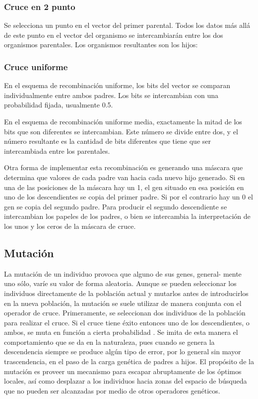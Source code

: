 \subsubsection{Cruce en 2 punto}\label{cruce2puntos}
Se selecciona un punto en el vector del primer parental. Todos los datos más allá de este punto en el vector del organismo se intercambiarán entre los dos organismos parentales. Los organismos resultantes son los hijos:

\subsubsection{Cruce uniforme}\label{cruceuniforme}

En el esquema de recombinación uniforme, los bits del vector se comparan individualmente entre ambos padres. Los bits se intercambian con una probabilidad fijada, usualmente 0.5.

En el esquema de recombinación uniforme media, exactamente la mitad de los bits que son diferentes se intercambian. Este número se divide entre dos, y el número resultante es la cantidad de bits diferentes que tiene que ser intercambiada entre los parentales.


Otra forma de implementar esta recombinación es generando una máscara que determina que valores de cada padre van hacia cada nuevo hijo generado. Si en una de las posiciones de la máscara hay un 1, el gen situado en esa posición en uno de los descendientes se copia del primer padre. Si por el contrario hay un 0 el gen se copia del segundo padre. Para producir el segundo descendiente se intercambian los papeles de los padres, o bien se intercambia la interpretación de los unos y los ceros de la máscara de cruce.


\subsection{Mutación}
La mutación de un individuo provoca que alguno de sus genes, general-
mente uno sólo, varíe su valor de forma aleatoria. Aunque se pueden seleccionar los individuos directamente de la población actual y mutarlos antes de introducirlos en la nueva población, la mutación se suele utilizar de manera conjunta con el operador de cruce. 
Primeramente, se seleccionan dos individuos de la población para realizar el cruce. Si el cruce tiene éxito entonces uno de los descendientes, o ambos, se muta en función a cierta probabilidad . Se imita de esta manera el comportamiento que se da en la naturaleza, pues cuando se genera la descendencia siempre se produce algún tipo de error, por lo general sin mayor trascendencia, en el paso de la carga genética de padres a hijos.
El propósito de la mutación es proveer un mecanismo para escapar abruptamente de los óptimos locales, así como desplazar a los individuos hacia zonas del espacio de búsqueda que no pueden ser alcanzadas por medio de otros operadores genéticos.

